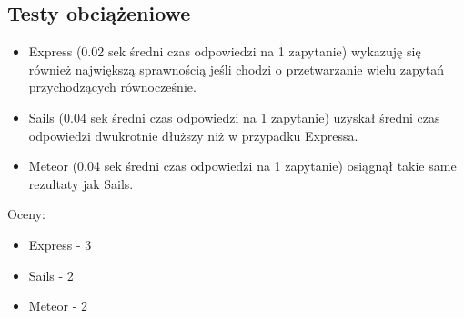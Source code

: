\documentclass[12pt]{report}
\begin{document}
    \subsection{Testy obciążeniowe}
      \begin{itemize}
        \item Express (0.02 sek średni czas odpowiedzi na 1 zapytanie) wykazuję się również największą sprawnością jeśli chodzi o przetwarzanie wielu zapytań przychodzących równocześnie.
        \item Sails (0.04 sek średni czas odpowiedzi na 1 zapytanie) uzyskał średni czas odpowiedzi dwukrotnie dłuższy niż w przypadku Expressa.
        \item Meteor (0.04 sek średni czas odpowiedzi na 1 zapytanie) osiągnął takie same rezultaty jak Sails.
      \end{itemize}
      Oceny:
      \begin{itemize}
        \item Express - 3
        \item Sails - 2
        \item Meteor - 2
      \end{itemize}
    \pagebreak
\end{document}
